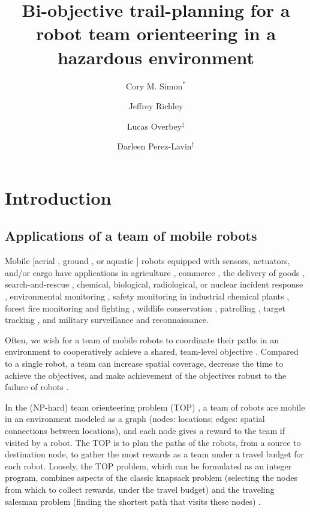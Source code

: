 \documentclass[fleqn,10pt,lineno]{wlpeerj}
\title{Bi-objective trail-planning for a robot team orienteering in a hazardous environment}
\author[1]{Cory M. Simon$^*$}
\author[2]{Jeffrey Richley}
\author[2]{Lucas Overbey$^\ddagger$}
\author[2]{Darleen Perez-Lavin$^\dagger$}
\affil[1]{School of Chemical, Biological, and Environmental Engineering. Oregon State University. Corvallis, OR. USA.}
\affil[2]{Naval Information Warfare Center Atlantic. Charleston, SC. USA.}
\begin{document}
\flushbottom
\maketitle
\thispagestyle{empty}



\clearpage


\section{Introduction}
\subsection{Applications of a team of mobile robots}
Mobile [aerial \cite{leutenegger2016flying}, ground \cite{chung2016wheeled}, or aquatic \cite{choi2016underwater}] robots equipped with sensors, actuators, and/or cargo have applications in agriculture 
\cite{santos2020path,bawden2017robot,mcallister2018multi}, 
commerce %
 \cite{wurman2008coordinating}, 
the delivery of goods \cite{coelho2014thirty}, 
search-and-rescue \cite{queralta2020collaborative,rouvcek2020darpa}, 
chemical, biological, radiological, or nuclear incident response %
 \cite{murphy2012projected,hutchinson2019unmanned}, 
 environmental monitoring \cite{dunbabin2012robots,hernandez2012mobile,yuan2020maritime}, 
 safety monitoring in industrial chemical plants \cite{soldan2014towards,francis2022gas}, 
 forest fire monitoring and fighting \cite{merino2012unmanned}, 
 wildlife conservation \cite{kamminga2018poaching},
 patrolling \cite{basilico2022recent},
 target tracking \cite{robin2016multi}, and 
 military surveillance and reconnaissance. 

Often, we wish for a team of mobile robots to coordinate their paths in an environment to cooperatively achieve a shared, team-level objective \cite{parker1995design,parker2007distributed}.
Compared to a single robot, a team can increase spatial coverage, decrease the time to achieve the objectives, and make achievement of the objectives robust to the failure of robots \cite{schranz2020swarm,brambilla2013swarm}.

In the (NP-hard) team orienteering \cite{golden1987orienteering} problem (TOP) \cite{chao1996team,gunawan2016orienteering,vansteenwegen2011orienteering}, a team of robots are mobile in an environment modeled as a graph (nodes: locations; edges: spatial connections between locations), and each node gives a reward to the team if visited by a robot.
The TOP is to plan the paths of the robots, from a source to destination node, to gather the most rewards as a team under a travel budget for each robot. 
Loosely, the TOP problem, which can be formulated as an integer program, combines aspects of the classic knapsack problem (selecting the nodes from which to collect rewards, under the travel budget) and the traveling salesman problem (finding the shortest path that visits these nodes) \cite{vansteenwegen2011orienteering}.
\end{document}

